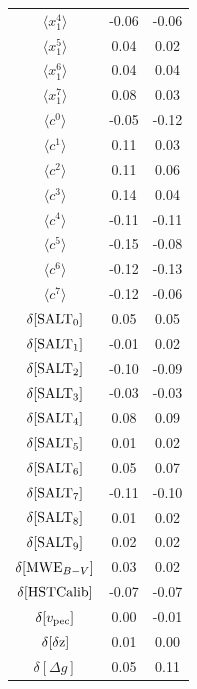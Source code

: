 \documentclass[a4paper,fleqn,usenatbib]{mnras}
\begin{document}
\begin{table}
\begin{tabular}{c|cc}
		$\langle x_1^{4} \rangle$ &   -0.06 &     -0.06     \\
		$\langle x_1^{5} \rangle$ &    0.04 &      0.02     \\
		$\langle x_1^{6} \rangle$ &    0.04 &      0.04     \\
		$\langle x_1^{7} \rangle$ &    0.08 &      0.03     \\
		$\langle c^{0} \rangle$ &   -0.05 &     -0.12     \\
		$\langle c^{1} \rangle$ &    0.11 &      0.03     \\
		$\langle c^{2} \rangle$ &    0.11 &      0.06     \\
		$\langle c^{3} \rangle$ &    0.14 &      0.04     \\
		$\langle c^{4} \rangle$ &   -0.11 &     -0.11     \\
		$\langle c^{5} \rangle$ &   -0.15 &     -0.08     \\
		$\langle c^{6} \rangle$ &   -0.12 &     -0.13     \\
		$\langle c^{7} \rangle$ &   -0.12 &     -0.06     \\
		$\delta [ {\rm SALT}_0 ]$ &    0.05 &      0.05     \\
		$\delta [ {\rm SALT}_1 ]$ &   -0.01 &      0.02     \\
		$\delta [ {\rm SALT}_2 ]$ &   -0.10 &     -0.09     \\
		$\delta [ {\rm SALT}_3 ]$ &   -0.03 &     -0.03     \\
		$\delta [ {\rm SALT}_4 ]$ &    0.08 &      0.09     \\
		$\delta [ {\rm SALT}_5 ]$ &    0.01 &      0.02     \\
		$\delta [ {\rm SALT}_6 ]$ &    0.05 &      0.07     \\
		$\delta [ {\rm SALT}_7 ]$ &   -0.11 &     -0.10     \\
		$\delta [ {\rm SALT}_8 ]$ &    0.01 &      0.02     \\
		$\delta [ {\rm SALT}_9 ]$ &    0.02 &      0.02     \\
		$\delta [ {\rm MWE}_{B-V} ]$ &    0.03 &      0.02     \\
		$\delta [ {\rm HST Calib} ]$ &   -0.07 &     -0.07     \\
		$\delta [ v_{\rm pec} ]$ &    0.00 &     -0.01     \\
		$\delta [ {\rm \delta z } ]$ &    0.01 &      0.00     \\
		$\delta [ \Delta g ]$ &    0.05 &      0.11     \\

\end{tabular}
\end{table}
\end{document}
